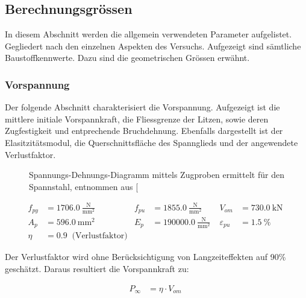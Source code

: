 \documentclass[
  11pt,
  letterpaper,
]{scrreprt}
\begin{document}
\subsection{Berechnungsgrössen}\label{berechnungsgruxf6ssen}

In diesem Abschnitt werden die allgemein verwendeten Parameter
aufgelistet. Gegliedert nach den einzelnen Aspekten des Versuchs.
Aufgezeigt sind sämtliche Baustoffkennwerte. Dazu sind die geometrischen
Grössen erwähnt.

\subsubsection{Vorspannung}\label{vorspannung}

Der folgende Abschnitt charakterisiert die Vorspannung. Aufgezeigt ist
die mittlere initiale Vorspannkraft, die Fliessgrenze der Litzen, sowie
deren Zugfestigkeit und entprechende Bruchdehnung. Ebenfalls dargestellt
ist der Elasitzitätsmodul, die Querschnittsfläche des Spannglieds und
der angewendete Verlustfaktor.

\begin{figure}[H]


\caption{\label{fig-sigma_eps_spannstahl}Spannungs-Dehnungs-Diagramm
mittels Zugproben ermittelt für den Spannstahl, entnommen aus
{[}\citeproc{ref-sigrist_versuche_1993}{5}{]}}

\end{figure}%

$$
\begin{aligned}
f_{py} &= 1706.0\ \frac{\mathrm{N}}{\mathrm{mm}^{2}} \; 
 &f_{pu} &= 1855.0\ \frac{\mathrm{N}}{\mathrm{mm}^{2}} \; 
 &V_{om} &= 730.0\ \mathrm{kN} \; 
\\[10pt]
 A_{p} &= 596.0\ \mathrm{mm}^{2} \; 
 &E_{p} &= 190000.0\ \frac{\mathrm{N}}{\mathrm{mm}^{2}} \; 
 &\varepsilon_{pu} &= 1.5\ \mathrm{\%} \; 
\\[10pt]
 \eta &= 0.9 \; \;\textrm{(Verlustfaktor)}
\end{aligned}
$$

Der Verlustfaktor wird ohne Berücksichtigung von Langzeiteffekten auf
90\% geschätzt. Daraus resultiert die Vorspannkraft zu:

$$
\begin{aligned}
P_{\infty} &= \eta \cdot V_{om} \; 
\end{aligned}
$$
\end{document}
